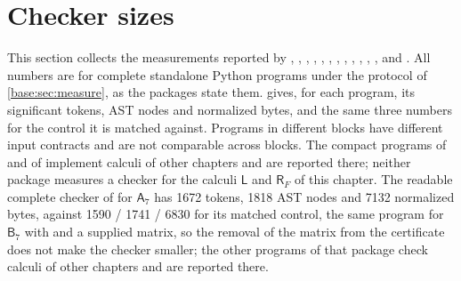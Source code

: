\section{Checker sizes}
\label{kern:sec:sizes}

This section collects the measurements reported by ,
, ,
, , ,
, ,
,
, , ,
 and .  All numbers are for complete standalone Python programs under the
protocol of \cref{base:sec:measure}, as the packages state them.
 gives, for each program, its significant tokens, AST
nodes and normalized bytes, and the same three numbers for the control it
is matched against.  Programs in different blocks have different input
contracts and are not comparable across blocks.  The compact programs of
 and of  implement calculi
of other chapters and are reported there; neither package measures a checker
for the calculi $\mathsf{L}$ and $\mathsf{R}_{F}$ of this chapter.
The readable complete checker of  for
$\mathsf{A}_7$ has 1672 tokens, 1818 AST nodes and 7132 normalized bytes,
against 1590 / 1741 / 6830 for its matched control, the same program for
$\mathsf{B}_7$ with  and a supplied matrix, so the removal of
the matrix from the certificate does not make the checker smaller; the other
programs of that package check calculi of other chapters and are reported
there.

